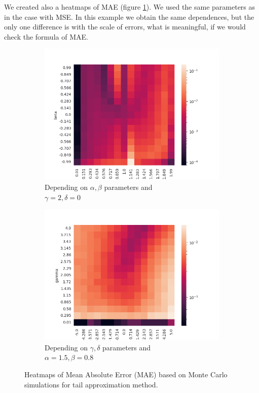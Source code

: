 \documentclass{article}
\begin{document}
		We created also a heatmaps of MAE (figure \ref{heat2}). We used the same parameters as in the case with MSE. In this example we obtain the same dependences, but the only one difference is with the scale of errors, what is meaningful, if we would check the formula of MAE.
		
		
		\begin{figure}[H]
			\begin{subfigure}{.5\textwidth}
				\centering
				\includegraphics[width=1\linewidth]{images/heatmap_cdf_MAE_alpha_beta.png}
				\caption{Depending on $\alpha, \beta$ parameters and \\$\gamma = 2, \delta = 0$}
			\end{subfigure}
			\begin{subfigure}[r]{.5\textwidth}
				\centering
				\includegraphics[width=1\linewidth]{images/heatmap_cdf_MAE_gamma_delta.png}
				\caption{Depending on $\gamma, \delta$ parameters and \\$\alpha = 1.5, \beta = 0.8$}
			\end{subfigure}
			\caption{Heatmaps of Mean Absolute Error (MAE) based on Monte Carlo simulations for tail approximation method.}\label{heat2}
		\end{figure}
\end{document}

